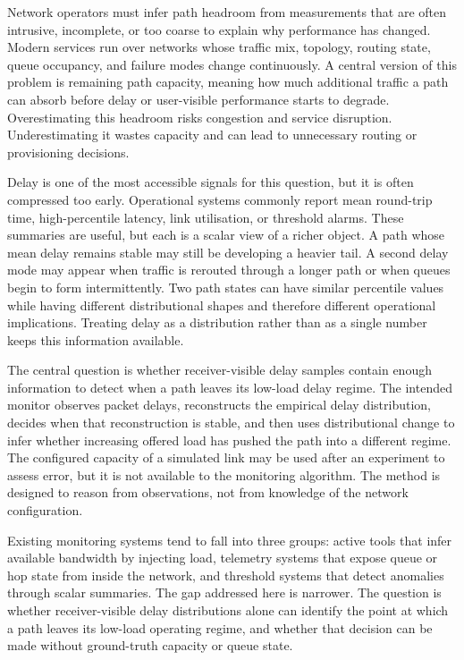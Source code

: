 Network operators must infer path headroom from measurements that are often intrusive, incomplete, or too coarse to explain why performance has changed. Modern services run over networks whose traffic mix, topology, routing state, queue occupancy, and failure modes change continuously. A central version of this problem is remaining path capacity, meaning how much additional traffic a path can absorb before delay or user-visible performance starts to degrade. Overestimating this headroom risks congestion and service disruption. Underestimating it wastes capacity and can lead to unnecessary routing or provisioning decisions.

Delay is one of the most accessible signals for this question, but it is often compressed too early. Operational systems commonly report mean round-trip time, high-percentile latency, link utilisation, or threshold alarms. These summaries are useful, but each is a scalar view of a richer object. A path whose mean delay remains stable may still be developing a heavier tail. A second delay mode may appear when traffic is rerouted through a longer path or when queues begin to form intermittently. Two path states can have similar percentile values while having different distributional shapes and therefore different operational implications. Treating delay as a distribution rather than as a single number keeps this information available.

The central question is whether receiver-visible delay samples contain enough information to detect when a path leaves its low-load delay regime. The intended monitor observes packet delays, reconstructs the empirical delay distribution, decides when that reconstruction is stable, and then uses distributional change to infer whether increasing offered load has pushed the path into a different regime. The configured capacity of a simulated link may be used after an experiment to assess error, but it is not available to the monitoring algorithm. The method is designed to reason from observations, not from knowledge of the network configuration.

Existing monitoring systems tend to fall into three groups: active tools that infer available bandwidth by injecting load, telemetry systems that expose queue or hop state from inside the network, and threshold systems that detect anomalies through scalar summaries. The gap addressed here is narrower. The question is whether receiver-visible delay distributions alone can identify the point at which a path leaves its low-load operating regime, and whether that decision can be made without ground-truth capacity or queue state.

